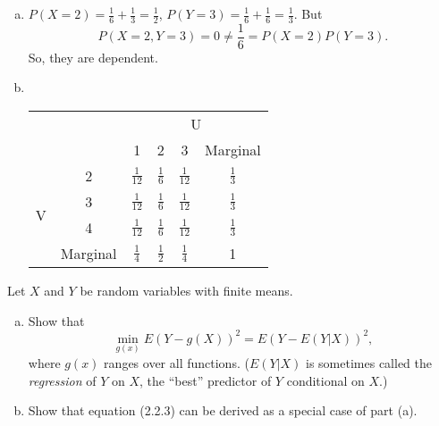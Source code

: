 \documentclass[14pt]{elegantbook}
\begin{document}
    \begin{solution}
        \begin{enumerate}[(a)]
            \item $P(X=2)=\frac{1}{6}+\frac{1}{3}=\frac{1}{2}$, $P(Y=3)=\frac{1}{6}+\frac{1}{6}=\frac{1}{3}$. But
            \[P(X=2, Y=3)=0\neq\frac{1}{6}=P(X=2)P(Y=3). \]
            So, they are dependent. 
            \item \ \vspace{-10pt}
\begin{table}[h]
\centering
\begin{tabular}{cc|cccc}
\hline
\multicolumn{2}{c|}{\multirow{2}{*}{}} & \multicolumn{4}{c}{U}                                                                \\ \cline{3-6} 
\multicolumn{2}{c|}{}                  & 1              & 2             & \multicolumn{1}{c|}{3}              & Marginal      \\ \hline
\multicolumn{1}{c|}{\multirow{4}{*}{V}} & 2 & $\frac{1}{12}$ & $\frac{1}{6}$ & \multicolumn{1}{c|}{$\frac{1}{12}$} & $\frac{1}{3}$ \\
\multicolumn{1}{c|}{}    & 3           & $\frac{1}{12}$ & $\frac{1}{6}$ & \multicolumn{1}{c|}{$\frac{1}{12}$} & $\frac{1}{3}$ \\
\multicolumn{1}{c|}{}    & 4           & $\frac{1}{12}$ & $\frac{1}{6}$ & \multicolumn{1}{c|}{$\frac{1}{12}$} & $\frac{1}{3}$ \\ \cline{2-6} 
\multicolumn{1}{c|}{}    & Marginal    & $\frac{1}{4}$  & $\frac{1}{2}$ & \multicolumn{1}{c|}{$\frac{1}{4}$}  &         1      \\ \hline
\end{tabular}
\end{table}
        \end{enumerate}
    \end{solution}

    \clearpage

    \setcounter{exer}{12}
    \begin{exercise}
        Let $X$ and $Y$ be random variables with finite means. 
        \begin{enumerate}[(a)]
            \item Show that 
            \[\min_{g(x)} E(Y-g(X))^2=E(Y-E(Y|X))^2, \]
            where $g(x)$ ranges over all functions. ($E(Y|X)$ is sometimes called the \emph{regression} of $Y$ on $X$, the ``best'' predictor of $Y$ conditional on $X$.)
            \item Show that equation (2.2.3) can be derived as a special case of part (a). 
        \end{enumerate}
    \end{exercise}
\end{document}

